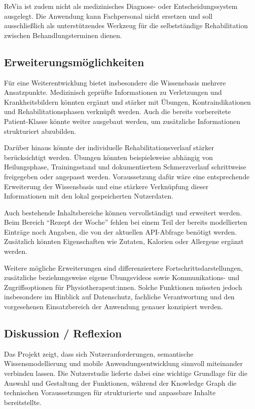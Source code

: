 ReVia ist zudem nicht als medizinisches Diagnose- oder Entscheidungssystem ausgelegt. Die Anwendung kann Fachpersonal nicht ersetzen und soll ausschließlich als unterstützendes Werkzeug für die selbstständige Rehabilitation zwischen Behandlungsterminen dienen.

\subsection{Erweiterungsmöglichkeiten}
\label{sec:erweiterungen}

Für eine Weiterentwicklung bietet insbesondere die Wissensbasis mehrere Ansatzpunkte. Medizinisch geprüfte Informationen zu Verletzungen und Krankheitsbildern könnten ergänzt und stärker mit Übungen, Kontraindikationen und Rehabilitationsphasen verknüpft werden. Auch die bereits vorbereitete Patient-Klasse könnte weiter ausgebaut werden, um zusätzliche Informationen strukturiert abzubilden.

Darüber hinaus könnte der individuelle Rehabilitationsverlauf stärker berücksichtigt werden. Übungen könnten beispielsweise abhängig von Heilungsphase, Trainingsstand und dokumentiertem Schmerzverlauf schrittweise freigegeben oder angepasst werden. Voraussetzung dafür wäre eine entsprechende Erweiterung der Wissensbasis und eine stärkere Verknüpfung dieser Informationen mit den lokal gespeicherten Nutzerdaten.

Auch bestehende Inhaltsbereiche können vervollständigt und erweitert werden. Beim Bereich ``Rezept der Woche'' fehlen bei einem Teil der bereits modellierten Einträge noch Angaben, die von der aktuellen API-Abfrage benötigt werden. Zusätzlich könnten Eigenschaften wie Zutaten, Kalorien oder Allergene ergänzt werden.

Weitere mögliche Erweiterungen sind differenziertere Fortschrittsdarstellungen, zusätzliche beziehungsweise eigene Übungsvideos sowie Kommunikations- und Zugriffsoptionen für Physiotherapeut:innen. Solche Funktionen müssten jedoch insbesondere im Hinblick auf Datenschutz, fachliche Verantwortung und den vorgesehenen Einsatzbereich der Anwendung genauer konzipiert werden.

\subsection{Diskussion / Reflexion}

Das Projekt zeigt, dass sich Nutzeranforderungen, semantische Wissensmodellierung und mobile Anwendungsentwicklung sinnvoll miteinander verbinden lassen. Die Nutzerstudie lieferte dabei eine wichtige Grundlage für die Auswahl und Gestaltung der Funktionen, während der Knowledge Graph die technischen Voraussetzungen für strukturierte und anpassbare Inhalte bereitstellte.

